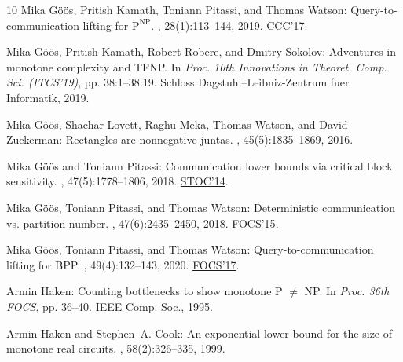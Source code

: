 \documentclass[11pt]{article}
\numberwithin{equation}{section}
\theoremstyle{definition}
\theoremstyle{plain}
\begin{document}
\begin{thebibliography}{10}
{\sc Mika G{\"o}{\"o}s, Pritish Kamath, Toniann Pitassi, and Thomas Watson}:
  Query-to-communication lifting for {$\textrm{P}^{\textrm{NP}}$}.
, 28(1):113--144, 2019.
\newblock \prelim \href{https://doi.org/10.4230/LIPIcs.CCC.2017.12}{CCC'17}.
\newblock [\epfmtdoi{10.1007/s00037-018-0175-5}]

{\sc Mika G{\"o}{\"o}s, Pritish Kamath, Robert Robere, and Dmitry Sokolov}:
  Adventures in monotone complexity and {TFNP}.
\newblock In {\em Proc. 10th Innovations in Theoret. Comp. Sci. (ITCS'19)}, pp.
  38:1--38:19. Schloss Dagstuhl--Leibniz-Zentrum fuer Informatik, 2019.

{\sc Mika G{\"o}{\"o}s, Shachar Lovett, Raghu Meka, Thomas Watson, and David
  Zuckerman}: Rectangles are nonnegative juntas.
, 45(5):1835--1869, 2016.
\newblock [\epfmtdoi{10.1137/15M103145X}]

{\sc Mika G{\"o}{\"o}s and Toniann Pitassi}: Communication lower bounds via
  critical block sensitivity.
, 47(5):1778--1806, 2018.
\newblock \prelim \href{https://doi.org/10.1145/2591796.2591838}{STOC'14}.
\newblock [\epfmtdoi{10.1137/16M1082007}]

{\sc Mika G{\"o}{\"o}s, Toniann Pitassi, and Thomas Watson}: Deterministic
  communication vs. partition number.
, 47(6):2435--2450, 2018.
\newblock \prelim \href{https://doi.org/10.1109/FOCS.2015.70}{FOCS'15}.
\newblock [\epfmtdoi{10.1137/16M1059369}]

{\sc Mika G{\"o}{\"o}s, Toniann Pitassi, and Thomas Watson}:
  Query-to-communication lifting for {BPP}.
, 49(4):132--143, 2020.
\newblock \prelim \href{https://doi.org/10.1109/FOCS.2017.21}{FOCS'17}.
\newblock [\epfmtdoi{10.1137/17M115339X}]

{\sc Armin Haken}: Counting bottlenecks to show monotone {P} {$\neq$} {NP}.
\newblock In {\em Proc. 36th FOCS}, pp. 36--40. IEEE Comp. Soc., 1995.

{\sc Armin Haken and Stephen~A. Cook}: An exponential lower bound for the size
  of monotone real circuits.
, 58(2):326--335, 1999.


\end{thebibliography}
\end{document}
